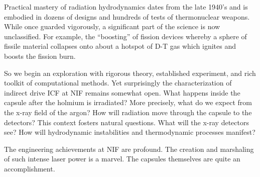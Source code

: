Practical mastery of radiation hydrodynamics dates from the late 1940's and is embodied in dozens of designs and hundreds of tests of thermonuclear weapons. While once guarded vigorously, a significant part of the science is now unclassified. For example, the ``boosting'' of fission devices whereby a sphere of fissile material collapses onto about a hotspot of D-T gas which ignites and boosts the fission burn.

So we begin an exploration with rigorous theory, established experiment, and rich toolkit of computational methods. Yet surprisingly the characterization of indirect drive ICF at NIF remains somewhat open. What happens inside the capsule after the holmium is irradiated? More precisely, what do we expect from the x-ray field of the argon? How will radiation move through the capsule to the detectors? This context fosters natural questions. What will the x-ray detectors see? How will hydrodynamic instabilities and thermodynamic processes manifest? 

The engineering achievements at NIF are profound. The creation and marshaling of such intense laser power is a marvel. The capsules themselves are quite an accomplishment.


\endinput %
